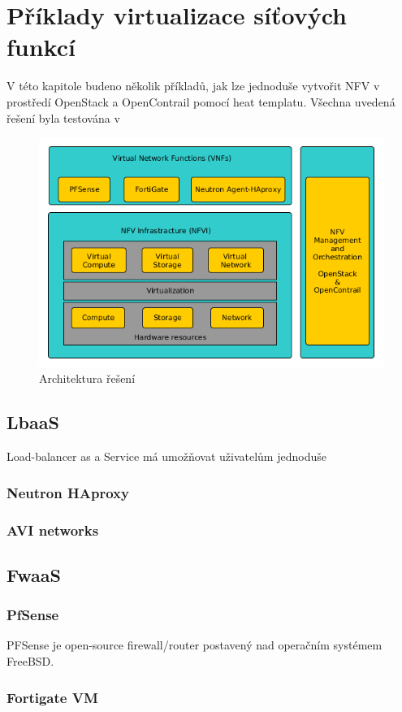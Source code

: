 \chapter{Příklady virtualizace síťových funkcí}

V této kapitole budeno několik příkladů, jak lze jednoduše vytvořit NFV v prostředí OpenStack a OpenContrail pomocí heat templatu. Všechna uvedená řešení byla testována v 


\begin{figure}[h]
\begin{centering}
\includegraphics[scale=0.21]{images/VNF_overview}
\par\end{centering}
\caption{Architektura řešení\label{fig:VNF_overview}}
\end{figure}


\section{LbaaS}\label{sub:interaction}

Load-balancer as a Service má umožňovat uživatelům jednoduše 

\subsection{Neutron HAproxy}\label{sub:interaction}


\subsection{AVI networks}\label{sub:interaction}


\section{FwaaS}\label{sub:interaction}



\subsection{PfSense}\label{sub:interaction}

PFSense je open-source firewall/router postavený nad operačním systémem FreeBSD.

\subsection{Fortigate VM}\label{sub:interaction}



